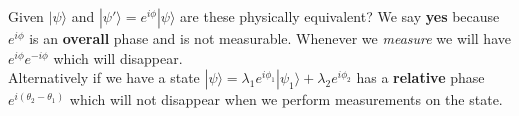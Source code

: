\documentclass[a4paper, 11pt]{article}
\begin{document}
Given $|\psi\rangle$ and $|\psi'\rangle = e^{i\phi}|\psi\rangle$ are these physically equivalent? We say \textbf{yes} because $e^{i\phi}$ is an \textbf{overall} phase and is not measurable. Whenever we \textit{measure} we will have $e^{i\phi}e^{-i\phi}$ which will disappear.  \\ 

Alternatively if we have a state $|\psi\rangle = \lambda_1 e^{i\phi_1}|\psi_1\rangle + \lambda_2 e^{i\phi_2}$ has a \textbf{relative} phase $e^{i(\theta_2-\theta_1)}$ which will not disappear when we perform measurements on the state. 
\end{document}
